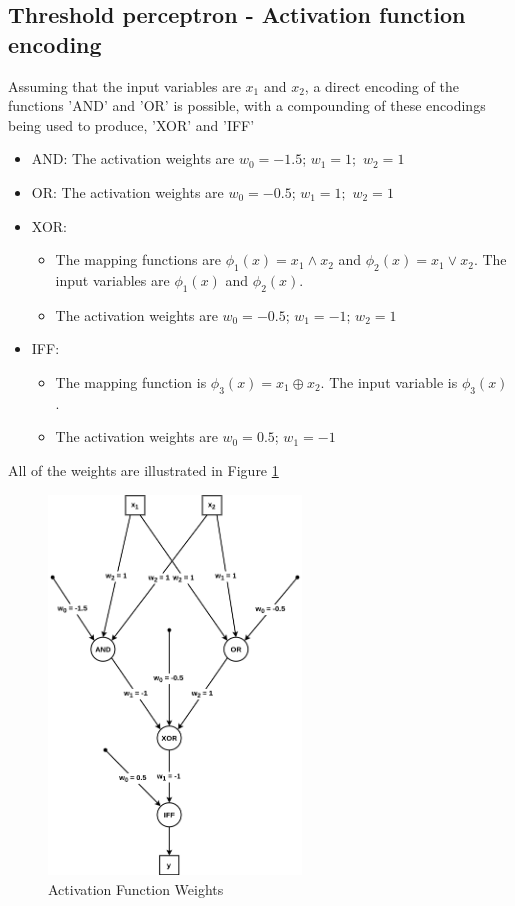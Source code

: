 \documentclass[a4paper]{article}
\begin{document}
\subsection{Threshold perceptron - Activation function encoding}
Assuming that the input variables are $x_1$ and $x_2$, a direct encoding of the functions 'AND' and 'OR' is possible, with a compounding of these encodings being used to produce, 'XOR' and 'IFF'
\begin{itemize}
	\item AND: The activation weights are $w_0 = -1.5$; $w_1 = 1;$ $w_2 = 1$
	\item OR: The activation weights are $w_0 = -0.5$; $w_1 = 1;$ $w_2 = 1$
	\item XOR: 
		\begin{itemize}
			\item The mapping functions are $\phi_1(x) = x_1 \land x_2$ and $\phi_2(x) = x_1 \lor x_2$. The input variables are $\phi_1(x)$ and $\phi_2(x)$.
			\item The activation weights are $w_0 = -0.5$; $w_1 = -1$; $w_2 = 1$
		\end{itemize}
	\item IFF: 
		\begin{itemize}
			\item The mapping function is $\phi_3(x) = x_1 \oplus x_2$. The input variable is $\phi_3(x)$.
			\item The activation weights are $w_0 = 0.5$; $w_1 = -1$
		\end{itemize}
\end{itemize}
All of the weights are illustrated in Figure \ref{fig_activation_function_weights}

\begin{figure}[h]
    \centering
    \includegraphics[width=0.6\textwidth]{images/activation_functions.png}
    \caption{Activation Function Weights}
    \label{fig_activation_function_weights}
\end{figure}
\end{document}
